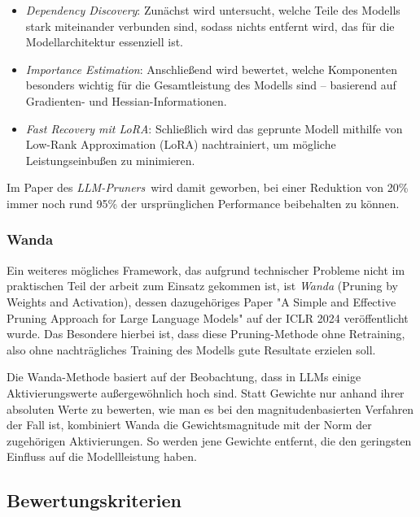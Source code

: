 \begin{itemize}
	\item \emph{Dependency Discovery}: Zunächst wird untersucht, welche Teile
	      des Modells stark miteinander verbunden sind, sodass nichts entfernt
	      wird, das für die Modellarchitektur essenziell ist.

	\item \emph{Importance Estimation}: Anschließend wird bewertet, welche
	      Komponenten besonders wichtig für die Gesamtleistung des Modells sind –
	      basierend auf Gradienten- und Hessian-Informationen.

	\item \emph{Fast Recovery mit LoRA}: Schließlich wird das geprunte Modell
	      mithilfe von Low-Rank Approximation (LoRA) nachtrainiert, um mögliche
	      Leistungseinbußen zu minimieren.
\end{itemize}

Im Paper des \emph{LLM-Pruners} wird damit geworben, bei einer Reduktion von
20\% immer noch rund 95\% der ursprünglichen Performance beibehalten zu können.

\subsubsection{Wanda}

Ein weiteres mögliches Framework, das aufgrund technischer Probleme nicht im
praktischen Teil der arbeit zum Einsatz gekommen ist, ist \emph{Wanda} (Pruning
by Weights and Activation), dessen dazugehöriges Paper "A Simple and Effective
Pruning Approach for Large Language Models" auf der ICLR 2024 veröffentlicht
wurde. Das Besondere hierbei ist, dass diese Pruning-Methode ohne Retraining,
also ohne nachträgliches Training des Modells gute Resultate erzielen
soll.\autocite[Vgl.][]{wanda}

Die Wanda-Methode basiert auf der Beobachtung, dass in LLMs einige
Aktivierungswerte außergewöhnlich hoch sind. Statt Gewichte nur anhand ihrer
absoluten Werte zu bewerten, wie man es bei den magnitudenbasierten Verfahren
der Fall ist, kombiniert Wanda die Gewichtsmagnitude mit der Norm der
zugehörigen Aktivierungen. So werden jene Gewichte entfernt, die den geringsten
Einfluss auf die Modellleistung haben.

\subsection{Bewertungskriterien}

